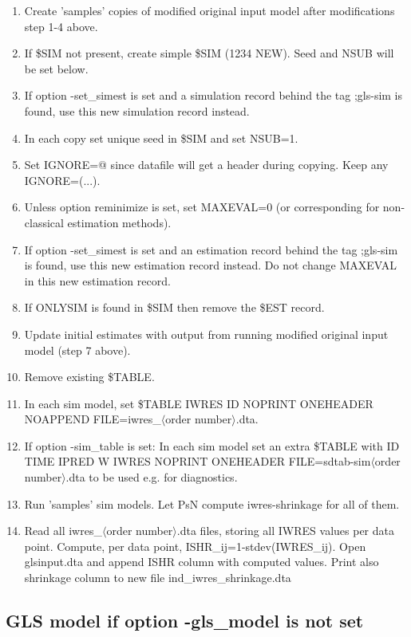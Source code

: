 \documentclass[a4paper,12pt]{article}
\begin{document}
\begin{enumerate}
\item Create 'samples' copies of modified original input model after modifications step 1-4 above.
\item If \$SIM not present, create simple \$SIM (1234 NEW). Seed and NSUB will be set below.
\item If option -set\_simest is set and a simulation record behind the tag ;gls-sim is found, use this new simulation record instead.  
\item In each copy set unique seed in \$SIM and set NSUB=1.
\item Set IGNORE=@ since datafile will get a header during copying. Keep any IGNORE=(...).
\item Unless option reminimize is set, set MAXEVAL=0 (or corresponding for non-classical estimation methods). 
\item If option -set\_simest is set and an estimation record behind the tag ;gls-sim is found, use this new estimation record instead. Do not change MAXEVAL in this new estimation record.
\item If ONLYSIM is found in \$SIM then remove the \$EST record.
\item Update initial estimates with output from running modified original input model (step 7 above).
\item Remove existing \$TABLE.
\item In each sim model, set \$TABLE IWRES ID NOPRINT ONEHEADER NOAPPEND FILE=iwres\_$\langle$order number$\rangle$.dta.
\item If option -sim\_table is set: In each sim model set an extra \$TABLE
 with ID TIME IPRED W IWRES NOPRINT ONEHEADER FILE=sdtab-sim$\langle$order number$\rangle$.dta to be used e.g. for diagnostics.
\item Run 'samples' sim models. Let PsN compute iwres-shrinkage for all of them.
\item Read all iwres\_$\langle$order number$\rangle$.dta files, storing all IWRES values per data point. Compute, per data point, ISHR\_ij=1-stdev(IWRES\_ij). Open glsinput.dta and append ISHR column with computed values. Print also shrinkage column to new file ind\_iwres\_shrinkage.dta
\end{enumerate}

\subsection{GLS model if option -gls\_model is not set}
\end{document}
